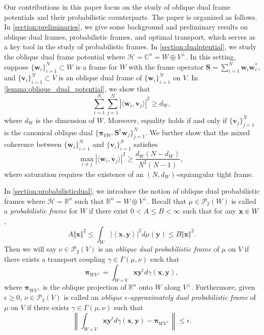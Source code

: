 \documentclass{amsart}
\numberwithin{equation}{section}
\newcommand{\bpi}{{\boldsymbol{\pi}}}
\theoremstyle{plain}
\theoremstyle{remark}
\theoremstyle{definition}
\begin{document}
Our contributions in this paper focus on the study of oblique dual frame potentials and their probabilistic counterparts. The paper is organized as follows.   In \cref{section:preliminaries}, we give some background and preliminary results on oblique dual frames, probabilistic frames, and optimal transport, which serves as a key tool in the study of probabilistic frames. In \cref{section:dualptential}, we study the oblique dual frame potential where $\mathcal{H} = \mathbb{C}^n=W \oplus V^\perp$. In this setting, suppose $\{\mathbf{w}_i\}_{i=1}^N \subset W$ is a frame for $W$ with the frame operator $\mathbf{S} = \sum_{i=1}^N \mathbf{w}_i\mathbf{w}_i^*$, and $\{\mathbf{v}_i\}_{i=1}^N \subset V$ is an oblique dual frame of $\{\mathbf{w}_i\}_{i=1}^N$ on $V$. In \cref{lemma:oblique_dual_potential}, we show that 
    \begin{equation*}
       \sum_{i=1}^N \sum_{j=1}^N |\langle \mathbf{w}_i, \mathbf{v}_j \rangle |^2 \geq d_W,
    \end{equation*}
where $d_W$ is the dimension of $W$. Moreover, equality holds if and only if $\{\mathbf{v}_j\}_{j=1}^N $ is the canonical oblique dual $ \{\bpi_{VW^\perp} \mathbf{S}^{\dagger} \mathbf{w}_j\}_{j=1}^N$.   We further show that the mixed coherence between $\{\mathbf{w}_i\}_{i=1}^N$ and $\{\mathbf{v}_i\}_{i=1}^N$ satisfies
    \begin{equation*}
       \underset{i \neq j}{\text{max}} \ |\langle \mathbf{w}_i, \mathbf{v}_j \rangle |^2 \geq \frac{d_W(N-d_W)}{N^2(N-1)},
    \end{equation*}
where saturation requires the existence of an $(N,d_W)$-equiangular tight frame.

In \cref{section:probabilisticdual}, we introduce the notion of oblique dual probabilistic frames where $\mathcal{H} = \mathbb{R}^n$ such that $\mathbb{R}^n = W \oplus V^\perp$. Recall that $\mu \in  \mathcal{P}_2(W)$ is called a \emph{probabilistic frame} for $W$ if there exist $0<A \leq B < \infty$ such that for any ${\bf x} \in W$, 
\begin{equation*}
    A \Vert \mathbf{x}  \Vert^2 \leq\int_{W} \vert \left\langle \mathbf{x},\mathbf{y} \right\rangle \vert ^2 d\mu(\mathbf{y})  \leq B \Vert \mathbf{x}  \Vert^2.
\end{equation*}
Then we will say $\nu \in \mathcal{P}_2(V)$ is an \emph{oblique dual probabilistic frame} of $\mu$ on $V$ if there exists a transport coupling $\gamma \in \Gamma(\mu, \nu)$ such that
    \begin{equation*}
       \bpi_{WV^\perp} = \int_{W \times V} \mathbf{x} \mathbf{y}^t d\gamma(\mathbf{x}, \mathbf{y}),
    \end{equation*}
where $\bpi_{WV^\perp}$ is the oblique projection of $\mathbb{R}^n$ onto $W$ along $V^\perp$. 
Furthermore, given $\epsilon \geq 0$,
$\nu \in \mathcal{P}_2(V)$ is called an \textit{oblique $\epsilon$-approximately dual probabilistic frame} of $\mu$ on $V$ if there exists $\gamma \in \Gamma(\mu, \nu)$ such that
    \begin{equation*}
        \left \| \int_{W \times V} \mathbf{x} \mathbf{y}^t d\gamma(\mathbf{x}, \mathbf{y}) -\bpi_{WV^\perp}  \right \| \leq \epsilon.
    \end{equation*}
    
\end{document}
